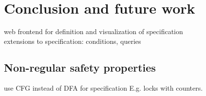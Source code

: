 

\chapter{Conclusion and future work}
web frontend for definition and visualization of specification\\
extensions to specification: conditions, queries

\section{Non-regular safety properties}
use CFG instead of DFA for specification
E.g. locks with counters.


